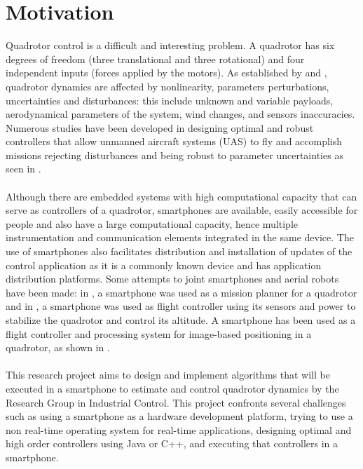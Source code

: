 \section{Motivation}
Quadrotor control is a difficult and interesting problem. A quadrotor has six degrees of freedom (three translational and three rotational) and four independent inputs (forces applied by the motors). As established by \cite{Liu2015} and \cite{Lopez2015}, quadrotor dynamics are affected by nonlinearity, parameters perturbations, uncertainties and disturbances: this include unknown and variable payloads, aerodynamical parameters of the system, wind changes, and sensors inaccuracies. Numerous studies have been developed in designing optimal and robust controllers that allow unmanned aircraft systems (UAS) to fly and accomplish missions rejecting disturbances and being robust to parameter uncertainties as seen in \cite{Jung2014, Kohno2014, Shang2016, Salazar2014}.\\\\
Although there are embedded systems with high computational capacity that can serve as controllers of a quadrotor, smartphones are available, easily accessible for people and also have a large computational capacity, hence multiple instrumentation and communication elements integrated in the same device. The use of smartphones also facilitates distribution and installation of updates of the control application as it is a commonly known device and has application distribution platforms. Some attempts to joint smartphones and aerial robots have been made: in \cite{Pearce2014a}, a smartphone was used as a mission planner for a quadrotor and in \cite{ALEMARK2014a}, a smartphone was used as flight controller using its sensors and power to stabilize the quadrotor and control its altitude. A smartphone has been used as a flight controller and processing system for image-based positioning in a quadrotor, as shown in \cite{Loianno2015}.
\\\\
This research project aims to design and implement algorithms that will be executed in a smartphone to estimate and control quadrotor dynamics by the Research Group in Industrial Control. This project confronts several challenges such as using a smartphone as a hardware development platform, trying to use a non real-time operating system for real-time applications, designing optimal and high order controllers using Java or C++, and executing that controllers in a smartphone.
\\\\
